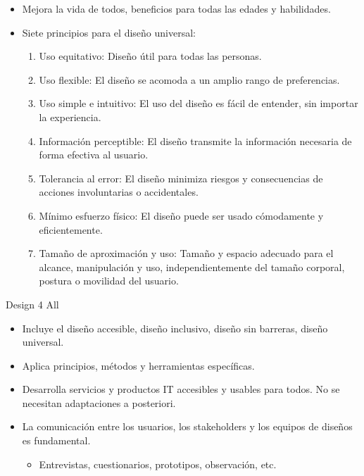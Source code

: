 \documentclass[12pt, twoside, openright]{report} %
\begin{document}
  \begin{itemize}
  
  \item
    Mejora la vida de todos, beneficios para todas las edades y
    habilidades.
  \item
    Siete principios para el diseño universal:

    \begin{enumerate}
    \def\labelenumi{\arabic{enumi}.}
    
    \item
      Uso equitativo: Diseño útil para todas las personas.
    \item
      Uso flexible: El diseño se acomoda a un amplio rango de
      preferencias.
    \item
      Uso simple e intuitivo: El uso del diseño es fácil de entender,
      sin importar la experiencia.
    \item
      Información perceptible: El diseño transmite la información
      necesaria de forma efectiva al usuario.
    \item
      Tolerancia al error: El diseño minimiza riesgos y consecuencias de
      acciones involuntarias o accidentales.
    \item
      Mínimo esfuerzo físico: El diseño puede ser usado cómodamente y
      eficientemente.
    \item
      Tamaño de aproximación y uso: Tamaño y espacio adecuado para el
      alcance, manipulación y uso, independientemente del tamaño
      corporal, postura o movilidad del usuario.
    \end{enumerate}
  \end{itemize}

  Design 4 All

  \begin{itemize}
  
  \item
    Incluye el diseño accesible, diseño inclusivo, diseño sin barreras,
    diseño universal.
  \item
    Aplica principios, métodos y herramientas específicas.
  \item
    Desarrolla servicios y productos IT accesibles y usables para todos.
    No se necesitan adaptaciones a posteriori.
  \item
    La comunicación entre los usuarios, los stakeholders y los equipos
    de diseños es fundamental.

    \begin{itemize}
    
    \item
      Entrevistas, cuestionarios, prototipos, observación, etc.
    \end{itemize}
  \end{itemize}
\end{document}
